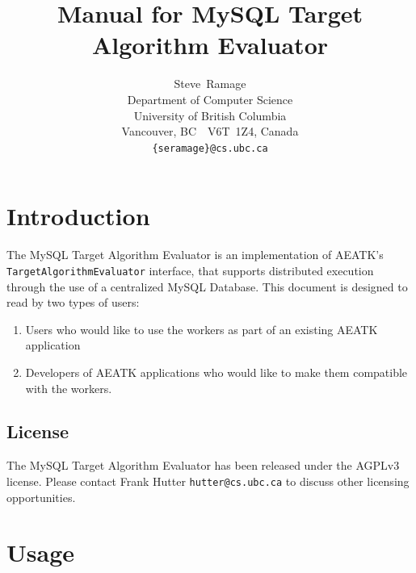 \documentclass[11pt,letterpaper,oneside]{article}
\begin{document}
\title{Manual for MySQL Target Algorithm Evaluator }
\author{
Steve~Ramage\\
Department of Computer Science\\
University of British Columbia\\
Vancouver, BC\ \ V6T~1Z4, Canada\\
\texttt{\{seramage\}@cs.ubc.ca}
}


\maketitle

\tableofcontents

\section{Introduction}

The MySQL Target Algorithm Evaluator is an implementation of AEATK's \texttt{TargetAlgorithmEvaluator} interface, that supports distributed execution through the use of a centralized MySQL Database. This document is designed to read by two types of users:

\begin{enumerate}
\item Users who would like to use the workers as part of an existing AEATK application
\item Developers of AEATK applications who would like to make them compatible with the workers.
\end{enumerate}

\subsection{License}

The MySQL Target Algorithm Evaluator has been released under the AGPLv3 license. Please contact Frank Hutter \texttt{hutter@cs.ubc.ca} to discuss other licensing opportunities.

\section{Usage}

\end{document}
